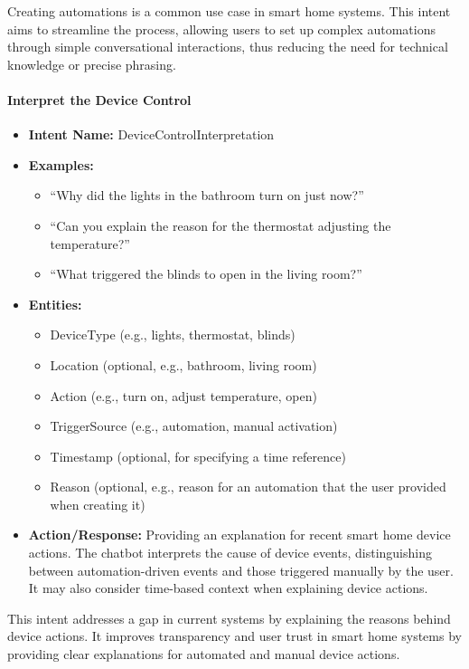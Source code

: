 Creating automations is a common use case in smart home systems. This intent aims to streamline the process, allowing users to set up complex automations through simple conversational interactions, thus reducing the need for technical knowledge or precise phrasing.

\paragraph{Interpret the Device Control}

\begin{itemize}
    \item \textbf{Intent Name:} DeviceControlInterpretation
    \item \textbf{Examples:}
    \begin{itemize}
        \item ``Why did the lights in the bathroom turn on just now?''
        \item ``Can you explain the reason for the thermostat adjusting the temperature?''
        \item ``What triggered the blinds to open in the living room?''
    \end{itemize}
    \item \textbf{Entities:}
    \begin{itemize}
        \item DeviceType (e.g., lights, thermostat, blinds)
        \item Location (optional, e.g., bathroom, living room)
        \item Action (e.g., turn on, adjust temperature, open)
        \item TriggerSource (e.g., automation, manual activation)
        \item Timestamp (optional, for specifying a time reference)
        \item Reason (optional, e.g., reason for an automation that the user provided when creating it)
    \end{itemize}
    \item \textbf{Action/Response:} Providing an explanation for recent smart home device actions. The chatbot interprets the cause of device events, distinguishing between automation-driven events and those triggered manually by the user. It may also consider time-based context when explaining device actions.
\end{itemize}

This intent addresses a gap in current systems by explaining the reasons behind device actions. It improves transparency and user trust in smart home systems by providing clear explanations for automated and manual device actions.

